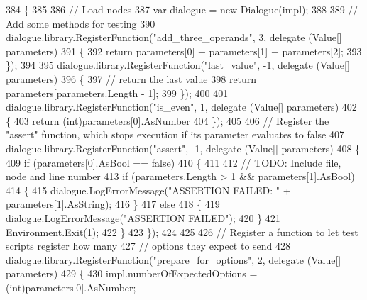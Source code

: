 \begin{DoxyCode}
384         \{
385 
386             \textcolor{comment}{// Load nodes}
387             var dialogue = \textcolor{keyword}{new} Dialogue(impl);
388 
389             \textcolor{comment}{// Add some methods for testing}
390             dialogue.library.RegisterFunction(\textcolor{stringliteral}{"add\_three\_operands"}, 3, delegate (Value[] parameters)
391             \{
392                 \textcolor{keywordflow}{return} parameters[0] + parameters[1] + parameters[2];
393             \});
394 
395             dialogue.library.RegisterFunction(\textcolor{stringliteral}{"last\_value"}, -1, delegate (Value[] parameters)
396             \{
397                 \textcolor{comment}{// return the last value}
398                 \textcolor{keywordflow}{return} parameters[parameters.Length - 1];
399             \});
400 
401             dialogue.library.RegisterFunction(\textcolor{stringliteral}{"is\_even"}, 1, delegate (Value[] parameters)
402             \{
403                 \textcolor{keywordflow}{return} (\textcolor{keywordtype}{int})parameters[0].AsNumber %
404             \});
405 
406             \textcolor{comment}{// Register the "assert" function, which stops execution if its parameter evaluates to false}
407             dialogue.library.RegisterFunction(\textcolor{stringliteral}{"assert"}, -1, delegate (Value[] parameters)
408             \{
409                 \textcolor{keywordflow}{if} (parameters[0].AsBool == \textcolor{keyword}{false})
410                 \{
411 
412                     \textcolor{comment}{// TODO: Include file, node and line number}
413                     \textcolor{keywordflow}{if} (parameters.Length > 1 && parameters[1].AsBool)
414                     \{
415                         dialogue.LogErrorMessage(\textcolor{stringliteral}{"ASSERTION FAILED: "} + parameters[1].AsString);
416                     \}
417                     \textcolor{keywordflow}{else}
418                     \{
419                         dialogue.LogErrorMessage(\textcolor{stringliteral}{"ASSERTION FAILED"});
420                     \}
421                     Environment.Exit(1);
422                 \}
423             \});
424 
425 
426             \textcolor{comment}{// Register a function to let test scripts register how many}
427             \textcolor{comment}{// options they expect to send}
428             dialogue.library.RegisterFunction(\textcolor{stringliteral}{"prepare\_for\_options"}, 2, delegate (Value[] parameters)
429             \{
430                 impl.numberOfExpectedOptions = (int)parameters[0].AsNumber;

\end{DoxyCode}
